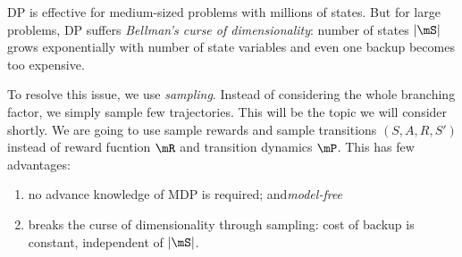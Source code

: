 \documentclass[RL]{subfiles}
\begin{document}
    DP is effective for medium-sized problems with millions of states. But for large problems, DP suffers \textit{Bellman's curse of dimensionality}: number of states $\left| \mS \right|$ grows exponentially with number of state variables and even one backup becomes too expensive.

    To resolve this issue, we use \textit{sampling}. Instead of considering the whole branching factor, we simply sample few trajectories. This will be the topic we will consider shortly. We are going to use sample rewards and sample transitions $\left( S,A,R,S' \right)$ instead of reward fucntion $\mR$ and transition dynamics $\mP$. This has few advantages:
    \begin{enumerate}
        \item no advance knowledge of MDP is required; and\hfill\textit{model-free}
        \item breaks the curse of dimensionality through sampling: cost of backup is constant, independent of $\left| \mS \right|$.
    \end{enumerate}

    
    
    
    
    
    
    
    
    
    
    
    
    
    
    
    
    
    
    
    
    
    
    
    
    
    
    
    
    
    
    
    
    
    
    
    
    
\end{document}
